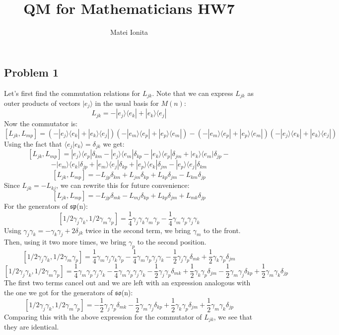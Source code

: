 \documentclass[12 pt]{article}
\title{QM for Mathematicians HW7}
\author{Matei Ionita}
\begin{document}
  \maketitle

\subsection*{Problem 1}
Let's first find the commutation relations for $L_{jk}$. Note that we can express $L_{jk}$ as outer products of vectors $|e_j\rangle$ in the usual basis for $M(n)$:
\[  L_{jk} = - |e_j\rangle\langle e_k| + |e_k\rangle\langle e_j|   \]
Now the commutator is:
\[  [L_{jk} , L_{mp}] =  ( - |e_j\rangle\langle e_k| + |e_k\rangle\langle e_j|)( - |e_m\rangle\langle e_p| + |e_p\rangle\langle e_m|) - ( - |e_m\rangle\langle e_p| + |e_p\rangle\langle e_m|)( - |e_j\rangle\langle e_k| + |e_k\rangle\langle e_j|)  \]
Using the fact that $\langle e_j|e_k\rangle = \delta_{jk}$ we get:
\[  [L_{jk} , L_{mp}] =  |e_j\rangle\langle e_p| \delta_{km} - |e_j\rangle\langle e_m| \delta_{kp} - |e_k\rangle\langle e_p| \delta_{jm} + |e_k\rangle\langle e_m| \delta_{jp} - \]
\[ - |e_m\rangle\langle e_k| \delta_{jp} + |e_m\rangle\langle e_j| \delta_{kp} + |e_p\rangle\langle e_k| \delta_{jm} - |e_p\rangle\langle e_j| \delta_{km}\]
\[   [L_{jk},L_{mp}] = - L_{jp} \delta_{km} + L_{jm}\delta_{kp} + L_{kp} \delta_{jm} - L_{km} \delta_{jp}  \]
Since $L_{jk} = - L_{kj}$, we can rewrite this for future convenience:
\[     [L_{jk},L_{mp}] = - L_{jp} \delta_{mk} - L_{mj}\delta_{kp} + L_{kp} \delta_{jm} + L_{mk} \delta_{jp}    \]
For the generators of $\mathfrak{sp}$(n):
\[  [ 1/2 \gamma_j \gamma_k , 1/2 \gamma_m \gamma_p ] = \frac{1}{4} \gamma_j\gamma_k\gamma_m\gamma_p - \frac{1}{4} \gamma_m\gamma_p\gamma_j\gamma_k  \]
Using $\gamma_j\gamma_k = - \gamma_k\gamma_j + 2\delta_{jk}$ twice in the second term, we bring $\gamma_m$ to the front. Then, using it two more times, we bring $\gamma_p$ to the second position.
\[   [ 1/2 \gamma_j \gamma_k , 1/2 \gamma_m \gamma_p ] = \frac{1}{4} \gamma_m\gamma_j\gamma_k\gamma_p - \frac{1}{4} \gamma_m\gamma_p\gamma_j\gamma_k  - \frac{1}{2} \gamma_j \gamma_p \delta_{mk} + \frac{1}{2} \gamma_k \gamma_p \delta_{jm}  \]
\[   [ 1/2 \gamma_j \gamma_k , 1/2 \gamma_m \gamma_p ] = \frac{1}{4} \gamma_m\gamma_p\gamma_j\gamma_k - \frac{1}{4} \gamma_m\gamma_p\gamma_j\gamma_k  - \frac{1}{2} \gamma_j \gamma_p \delta_{mk} + \frac{1}{2} \gamma_k \gamma_p \delta_{jm} - \frac{1}{2} \gamma_m \gamma_j \delta_{kp} + \frac{1}{2} \gamma_m \gamma_k \delta_{jp} \]
The first two terms cancel out and we are left with an expression analogous with the one we got for the generators of $\mathfrak{so}$(n):
\[    [ 1/2 \gamma_j \gamma_k , 1/2 \gamma_m \gamma_p ] =  - \frac{1}{2} \gamma_j \gamma_p \delta_{mk} - \frac{1}{2} \gamma_m \gamma_j \delta_{kp} + \frac{1}{2} \gamma_k \gamma_p \delta_{jm}  + \frac{1}{2} \gamma_m \gamma_k \delta_{jp}   \]
Comparing this with the above expression for the commutator of $L_{jk}$, we see that they are identical.
\end{document}

